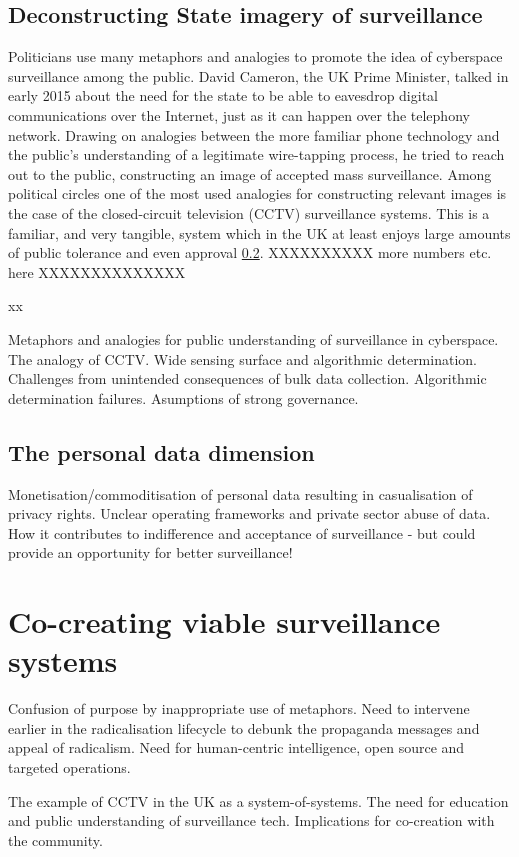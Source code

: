 \documentclass{llncs}
\begin{document}
\subsection{Deconstructing State imagery of surveillance}
Politicians use many metaphors and analogies to promote the idea of cyberspace surveillance among the public. David Cameron, the UK Prime Minister, talked in early 2015 about the need for the state to be able to eavesdrop digital communications over the Internet, just as it can happen over the telephony network. Drawing on analogies between the more familiar phone technology and the public's understanding of a legitimate wire-tapping process, he tried to reach out to the public, constructing an image of accepted mass surveillance. Among political circles one of the most used analogies for constructing relevant images is the case of the closed-circuit television (CCTV) surveillance systems. This is a familiar, and very tangible, system which in the UK at least enjoys large amounts of public tolerance and even approval \ref{}. XXXXXXXXXX more numbers etc. here XXXXXXXXXXXXXX

xx

Metaphors and analogies for public understanding of surveillance in cyberspace. The analogy of CCTV. Wide sensing surface and algorithmic determination. Challenges from unintended consequences of bulk data collection. Algorithmic determination failures. Asumptions of strong governance.
\subsection{The personal data dimension}
Monetisation/commoditisation of personal data resulting in casualisation of privacy rights. Unclear operating frameworks and private sector abuse of data. How it contributes to indifference and acceptance of surveillance - but could provide an opportunity for better surveillance!

\section{Co-creating viable surveillance systems}
\label{sec:Creating}
Confusion of purpose by inappropriate use of metaphors. Need to intervene earlier in the radicalisation lifecycle to debunk the propaganda messages and appeal of radicalism. Need for human-centric intelligence, open source and targeted operations.

The example of CCTV in the UK as a system-of-systems. The need for education and public understanding of surveillance tech. Implications for co-creation with the community.
\end{document}
